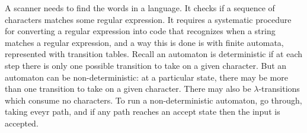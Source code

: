 A scanner needs to find the words in a language. 
It checks if a sequence of characters matches 
some regular expression. It requires a systematic 
procedure for converting a regular expression
into code that recognizes when a string matches 
a regular expression, and a way this is done is 
with finite automata, represented with transition 
tables. Recall an automaton is deterministic
if at each step there is only one possible transition
to take on a given character. 
But an automaton can be non-deterministic: at a 
particular state, there may be
more than one transition to take on a given 
character. There may also be $\lambda$-transitions 
which consume no characters. To run a non-deterministic
automaton, go through, taking eveyr path, and if 
any path reaches an accept state then the input is 
accepted. 